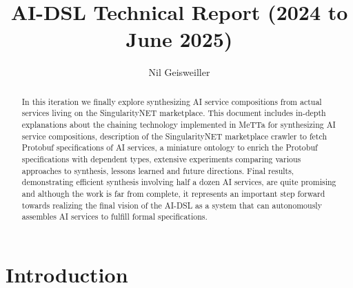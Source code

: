 \documentclass[]{report}
\begin{document}
\title{AI-DSL Technical Report (2024 to June 2025)}
\author{Nil Geisweiller}
\maketitle

\begin{abstract}
In this iteration we finally explore synthesizing AI service
compositions from actual services living on the SingularityNET
marketplace.  This document includes in-depth explanations about the
chaining technology implemented in MeTTa for synthesizing AI service
compositions, description of the SingularityNET marketplace crawler to
fetch Protobuf specifications of AI services, a miniature ontology to
enrich the Protobuf specifications with dependent types, extensive
experiments comparing various approaches to synthesis, lessons learned
and future directions.  Final results, demonstrating efficient
synthesis involving half a dozen AI services, are quite promising and
although the work is far from complete, it represents an important
step forward towards realizing the final vision of the AI-DSL as a
system that can autonomously assembles AI services to fulfill formal
specifications.
\end{abstract}

\tableofcontents

\chapter{Introduction}
\end{document}
